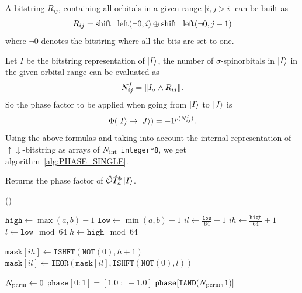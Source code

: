 \documentclass[./thesis.tex]{subfiles}
\begin{document}
A bitstring $R_{ij}$, containing all orbitals in a given range $]i, j>i[$ can be built as 
\begin{equation}
R_{ij}=\text{shift\_left}(\neg{0},i) \oplus \text{shift\_left}(\neg{0},j-1)
\end{equation}
where $\neg{0}$ denotes the bitstring where all the bits are set to one.

Let $I$ be the bitstring representation of $\ket{I}$, the number of $\sigma$-spinorbitals in $\ket{I}$ in the given orbital range can be evaluated as
\begin{equation}
N^{I}_{ij} = \norm{I_{\sigma} \wedge R_{ij}}.
\end{equation}
So the phase factor to be applied when going from $\ket{I}$ to $\ket{J}$ is 
\begin{equation}
{\Phi \qty(\ket{I} \rightarrow \ket{J})} = -1^{p(N^I_{ij})}.
\end{equation}
Using the above formulas and taking into account the internal representation of $\uparrow \downarrow$-bitstring as arrays of ${N_\text{int}}$ \lstinline{integer*8}, we get algorithm~\ref{alg:PHASE_SINGLE}.   


\begin{algorithm}
	\caption{Returns the phase factor of ${\hat{\mathcal{O}}} {\hat{T}_{a}^{b}} \ket{I}$.}
	\label{alg:PHASE_SINGLE}
	
	\Fn(){}{
		$\texttt{high} \gets \max(a,b)-1$ \;
		$\texttt{low} \gets \min(a,b)-1$ \;
		$il \gets \frac{\texttt{low}}{64} + 1$ \;
		$ih \gets \frac{\texttt{high}}{64} + 1$ \;
		$l \gets \texttt{low} \mod 64$ \;
		$h \gets \texttt{high} \mod 64$ \; 

		
		$\texttt{mask}[ih] \gets \texttt{ISHFT}(\texttt{NOT}(0), h+1)$ \;
		$\texttt{mask}[il] \gets \texttt{IEOR}(\texttt{mask}[il], \texttt{ISHFT}(\texttt{NOT}(0), l))$ \;
		
		
		${N_\text{perm}} \gets 0$ \;
                $\texttt{phase}[0:1] = [ 1.0 \;;\; -1.0 ]$ \;
                \KwRet $\texttt{phase}[\texttt{IAND}({N_\text{perm}},1)]$ \;
		}
\end{algorithm}
\end{document}
